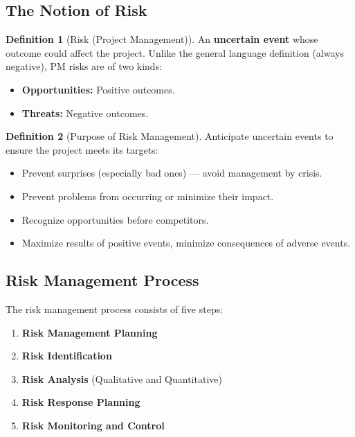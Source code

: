 \documentclass[11pt,a4paper]{article}
\theoremstyle{definition}
\newtheorem{definition}{Definition}[section]
\theoremstyle{plain}
\begin{document}
\subsection{The Notion of Risk}

\begin{definition}[Risk (Project Management)]
An \textbf{uncertain event} whose outcome could affect the project. Unlike the general language definition (always negative), PM risks are of two kinds:
\begin{itemize}[nosep]
  \item \textbf{Opportunities:} Positive outcomes.
  \item \textbf{Threats:} Negative outcomes.
\end{itemize}
\end{definition}

\begin{definition}[Purpose of Risk Management]
Anticipate uncertain events to ensure the project meets its targets:
\begin{itemize}[nosep]
  \item Prevent surprises (especially bad ones) --- avoid management by crisis.
  \item Prevent problems from occurring or minimize their impact.
  \item Recognize opportunities before competitors.
  \item Maximize results of positive events, minimize consequences of adverse events.
\end{itemize}
\end{definition}

\subsection{Risk Management Process}

The risk management process consists of five steps:

\begin{enumerate}[label=\textbf{\arabic*.}]
  \item \textbf{Risk Management Planning}
  \item \textbf{Risk Identification}
  \item \textbf{Risk Analysis} (Qualitative and Quantitative)
  \item \textbf{Risk Response Planning}
  \item \textbf{Risk Monitoring and Control}
\end{enumerate}
\end{document}
